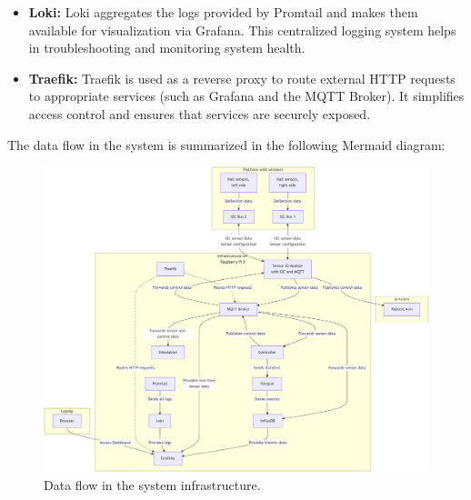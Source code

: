 \begin{itemize}
    \item \textbf{Loki:}
    Loki aggregates the logs provided by Promtail and makes them available for visualization via Grafana.
    This centralized logging system helps in troubleshooting and monitoring system health.

    \item \textbf{Traefik:}
    Traefik is used as a reverse proxy to route external HTTP requests to appropriate services (such as Grafana and the MQTT Broker).
    It simplifies access control and ensures that services are securely exposed.
\end{itemize}

\noindent The data flow in the system is summarized in the following Mermaid diagram:

\begin{figure}[H]
    \centering
    \includegraphics[width=\textwidth]{figures/services}
    \caption{Data flow in the system infrastructure.}
    \label{fig:data_flow}
\end{figure}

